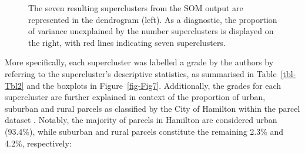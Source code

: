 \documentclass[
  authoryear,
  preprint,
  3p]{elsarticle}
\begin{document}
\begin{figure}


\caption{\label{fig-Fig6}The seven resulting superclusters from the SOM
output are represented in the dendrogram (left). As a diagnostic, the
proportion of variance unexplained by the number superclusters is
displayed on the right, with red lines indicating seven superclusters.}

\end{figure}%

More specifically, each supercluster was labelled a grade by the authors
by referring to the supercluster's descriptive statistics, as summarised
in Table~\ref{tbl-Tbl2} and the boxplots in Figure~\ref{fig-Fig7}.
Additionally, the grades for each supercluster are further explained in
context of the proportion of urban, suburban and rural parcels as
classified by the City of Hamilton within the parcel dataset
\citep{Teranet_2021}. Notably, the majority of parcels in Hamilton are
considered urban (93.4\%), while suburban and rural parcels constitute
the remaining 2.3\% and 4.2\%, respectively:
\end{document}
